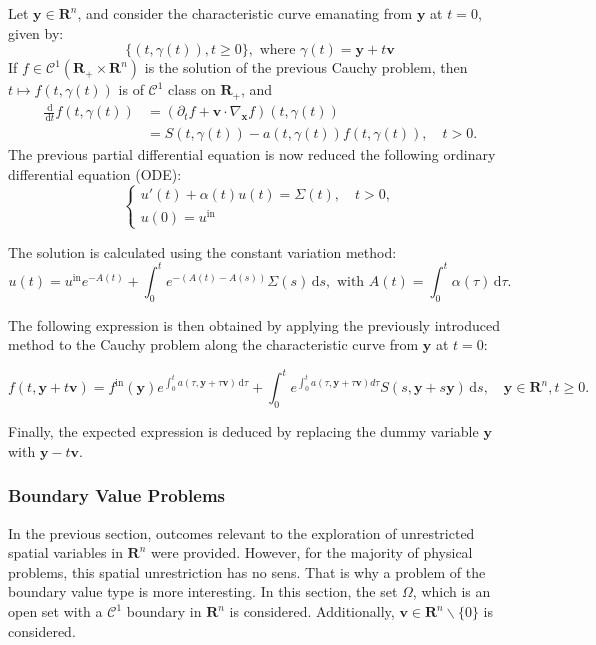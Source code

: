 \documentclass[a4paper, 11pt]{article}
\newcommand{\bm}{\symbf}
\newcommand{\di}{\ensuremath{\, \mathrm{d}}}
\begin{document}
Let $\bm{y} \in \bm{R}^n$, and consider the characteristic curve emanating from $\bm{y}$ at $t=0$, given by:
\begin{equation}
\{(t,\gamma(t)),  t\geq 0\} , \text{ where } \gamma (t)=\bm{y}+t\bm{v}
\end{equation}
If $f \in \mathcal{C}^1(\bm{R}_+ \times \bm{R}^n)$ is the solution of the previous Cauchy problem, then $t \mapsto f(t,\gamma(t))$ is of $\mathcal{C}^1$ class on $\bm{R}_+$, and 
\[
\begin{aligned}
\frac{\di}{\di t}f(t,\gamma(t))&=\left(
\partial_t f + \bm{v} \cdot \nabla_{\bm{x}}  f\right)(t,\gamma(t))  \\ &= S(t,\gamma(t))-a(t,\gamma(t))f(t,\gamma(t)), \quad t>0.
\end{aligned}
\]
The previous partial differential equation is now reduced the following ordinary differential equation (ODE):
\[
\begin{cases}
u'(t)+\alpha(t)u(t)=\Sigma(t), \quad t>0,\\
u(0)=u^{\mathrm{in}}
\end{cases}
\]

The solution is calculated using the constant variation method:
\[ u(t) = u^{\mathrm{in}} e^{-A(t)} + \int_{0}^{t} e^{-(A(t)-A(s))}\Sigma(s)\di s, \text{ with } A(t)=\int_{0}^{t} \alpha (\tau) \di\tau. \]

The following expression is then obtained by applying the previously introduced method to the Cauchy problem along the characteristic curve from $\bm{y}$ at $t=0$:

\begin{equation}
f(t,\bm{y}+t\bm{v}) = f^{\mathrm{in}}(\bm{y}) e^{\int_{0}^{t}a(\tau,\bm{y}+\tau \bm{v})\di\tau} + \int_{0}^{t} e^{\int_{0}^{t}a(\tau,\bm{y}+\tau \bm{v})d\tau}S(s,\bm{y}+s\bm{y})\di s, \quad \bm{y}\in \bm{R}^n, t \geq 0.
\end{equation}

Finally, the expected expression is deduced by replacing the dummy variable $\bm{y}$ with $\bm{y}-t\bm{v}$.

\subsubsection{Boundary Value Problems}

In the previous section, outcomes relevant to the exploration of unrestricted spatial variables in $\bm{R}^n$ were provided. However, for the majority of physical problems, this spatial unrestriction has no sens. That is why a problem of the boundary value type is more interesting. In this section, the set $\Omega$, which is an open set with a $\mathcal{C}^1$ boundary in $\bm{R}^n$ is considered. Additionally, $\bm{v} \in \bm{R}^n\backslash \{0\}$ is considered.
\end{document}
